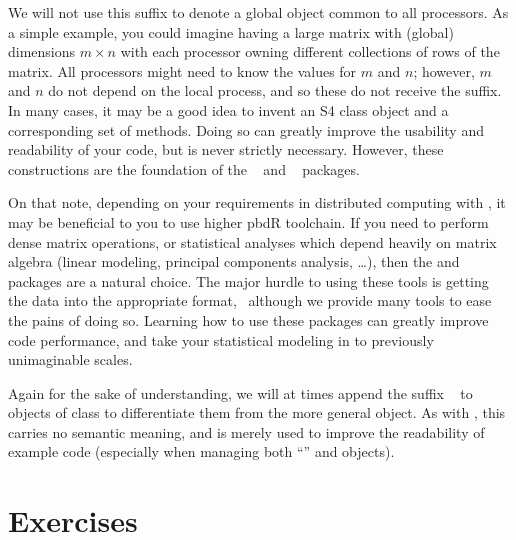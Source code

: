 We will not use this suffix to denote a global object common to all processors.  As a simple example, you could imagine having a large matrix with (global) dimensions $m\times n$ with each processor owning different collections of rows of the matrix.  All processors might need to know the values for $m$ and $n$; however, $m$ and $n$ do not depend on the local process, and so these do not receive the  suffix.  In many cases, it may be a good idea to invent an S4 class object and a corresponding set of methods.  Doing so can greatly improve the usability and readability of your code, but is never strictly necessary.  However, these constructions are the foundation of the ~\citep{Schmidt2012pbdBASEpackage} and
~\citep{Schmidt2012pbdDMATpackage} packages.

On that note, depending on your requirements in distributed computing with , it may be beneficial to you to use higher pbdR toolchain.  If you need to perform dense matrix operations, or statistical analyses which depend heavily on matrix algebra (linear modeling, principal components analysis, \dots), then the  and  packages are a natural choice.  The major hurdle to using these tools is getting the data into the appropriate
 format,~ although we provide many tools to ease the pains of doing so.  Learning how to use these packages can greatly improve code performance, and take your statistical modeling in  to previously unimaginable scales.

Again for the sake of understanding, we will at times append the suffix
~ to objects of class  to differentiate them from the more general  object.  As with , this carries no semantic meaning, and is merely used to improve the readability of example code (especially when managing both ``'' and  objects).




\section{Exercises}
\label{sec:background}

